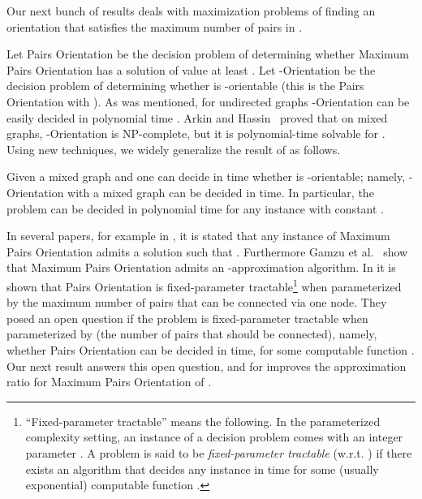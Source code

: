 \documentclass[envcountsame]{llncs}
\begin{document}
Our next bunch of results deals with maximization problems of finding an orientation that 
satisfies the maximum number of pairs in . 

\vspace{0.1cm}

\begin{center} 
\end{center}

\vspace{0.1cm}

Let {\sf  Pairs Orientation} be the decision problem of determining whether 
{\sf Ma\-xi\-mum Pairs Orientation} has a solution of value at least .
Let {\sf -Orientation} be the decision problem of determining whether 
 is -orientable (this is the {\sf  Pairs Orientation} with ).
As was mentioned, for undirected graphs {\sf -Orientation} can be easily decided 
in polynomial time \cite{HM}.
Arkin and Hassin~\cite{H1} proved that on mixed graphs, {\sf -Orientation}
is NP-complete, but it is polynomial-time solvable for .
Using new techniques, we widely generalize the result of \cite{H1} as follows.

\begin{theorem} \label{t:mix}
Given a mixed graph  and  one can decide in  time
whether  is -orientable;
namely, {\sf -Orientation} with a mixed graph  can be decided in  time.
In particular, the problem can be decided in polynomial time for any instance with constant .
\end{theorem}

In several papers, for example in \cite{ZV}, 
it is stated that any instance of {\sf Ma\-xi\-mum Pairs Orientation} 
admits a solution  such that . 
Furthermore Gamzu et al.~\cite{segev-approx} show that
{\sf Maximum Pairs Orientation} admits an -approximation algorithm.
In \cite{fpt} it is shown that {\sf  Pairs Orientation} is fixed-parameter 
tractable\footnote{``Fixed-parameter tractable'' means the following. 
In the parameterized complexity setting, an instance of a decision problem 
comes with an integer parameter .
A problem is said to be {\em fixed-parameter tractable} (w.r.t. ) if there exists an algorithm 
that decides any instance  in time  for some (usually exponential) 
computable function .}
when parameterized by the maximum number of pairs that can be connected via one node.
They posed an open question if the problem is fixed-parameter tractable when parameterized by 
(the number of pairs that should be connected),
namely, whether {\sf  Pairs Orientation} can be decided in  time, 
for some computable function .
Our next result answers this open question, and for  improves the approximation 
ratio  for {\sf Maximum Pairs Orientation} of \cite{ZV,segev-approx}. 
\end{document}
